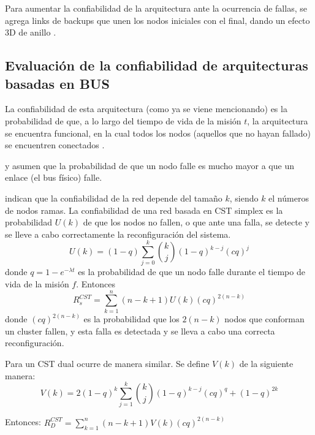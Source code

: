Para aumentar la confiabilidad de la arquitectura ante la ocurrencia de fallas, se agrega links de backups que unen los nodos iniciales con el final, dando un efecto 3D de anillo \citep{Tai99}.

\subsection{Evaluación de la confiabilidad de arquitecturas basadas en BUS}
La confiabilidad de esta arquitectura (como ya se viene mencionando) es la probabilidad de que, a lo largo del tiempo de vida de la misión $t$, la arquitectura se encuentra funcional, en la cual todos los nodos (aquellos que no hayan fallado) se encuentren conectados \citep{Tai99}.

\cite{Tai99} y \cite{Chau99} asumen que la probabilidad de que un nodo falle es mucho mayor a que un enlace (el bus físico) falle.

\cite{Tai99} indican que la confiabilidad de la red depende del tamaño $k$, siendo $k$ el números de nodos ramas. La confiabilidad de una red basada en \ac{CST} simplex es la probabilidad $U(k)$ de que los nodos no fallen, o que ante una falla, se detecte y se lleve a cabo correctamente la reconfiguración del sistema. $$U(k) = (1-q) \sum_{j=0}^{k} {{k}\choose{j}} (1-q)^{k-j} (cq)^j $$ donde $q = 1-e^{-\lambda t}$ es la probabilidad de que un nodo falle durante el tiempo de vida de la misión $f$. Entonces $$R_s^{CST} = \sum_{k=1}^n (n-k+1)U(k)(cq)^{2(n-k)}$$ donde $(cq)^{2(n-k)}$ es la probabilidad que los  $2(n-k)$ nodos que conforman un cluster fallen, y esta falla es detectada y se lleva a cabo una correcta reconfiguración.

Para un \ac{CST} dual ocurre de manera similar. Se define $V(k)$ de la siguiente manera: $$V(k) = 2(1-q)^k \sum_{j=1}^k {{k}\choose{j}} (1-q)^{k-j} (cq)^q + (1-q)^{2k}$$

Entonces:  $R_D^{CST} =  \sum_{k=1}^n (n-k+1) V(k) (cq)^{2(n-k)}$
